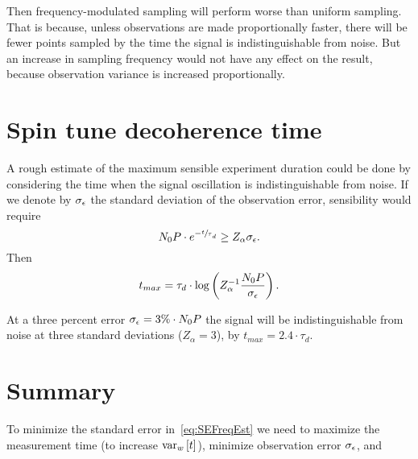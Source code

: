 \documentclass{article}
\begin{document}
Then frequency-modulated sampling will perform worse than uniform sampling. That is because, unless observations are made proportionally faster, there will be fewer points sampled by the time the signal is indistinguishable from noise. But an increase in sampling frequency would not have any effect on the result, because observation variance is increased proportionally.


\section{Spin tune decoherence time}

A rough estimate of the maximum sensible experiment duration could be done by considering the time when the signal oscillation is indistinguishable from noise. If we denote by $\SD{\obs}$ the standard deviation of the observation error, sensibility would require
\[
	N_0P\cdot e^{-\sfrac t\tau_d} \geq Z_\alpha \SD{\obs}.
\]
Then 
\[
	t_{max} = \tau_d\cdot \log\bkt{Z_\alpha^{-1}\frac{N_0P}{\SD{\obs}}}.
\]

At a three percent error $\SD{\obs} = 3\%\cdot N_0P$ the signal will be indistinguishable from noise at three standard deviations ($Z_\alpha = 3$), by $t_{max} = 2.4\cdot \tau_d$. 

%

\section*{Summary}
To minimize the standard error in~\eqref{eq:SEFreqEst} we need to maximize the measurement time (to increase $\var[w]{t}$), minimize observation error $\SD{\obs}$, and 
\end{document}
